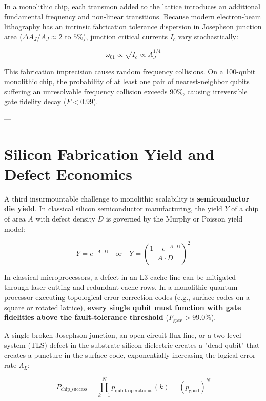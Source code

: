In a monolithic chip, each transmon added to the lattice introduces an additional fundamental frequency and non-linear transitions. Because modern electron-beam lithography has an intrinsic fabrication tolerance dispersion in Josephson junction area ($\Delta A_J / A_J \approx 2\text{ to }5\%$), junction critical currents $I_c$ vary stochastically:

\begin{equation}
    \omega_{01} \propto \sqrt{I_c} \propto A_J^{1/4}
\end{equation}

This fabrication imprecision causes random frequency collisions. On a 100-qubit monolithic chip, the probability of at least one pair of nearest-neighbor qubits suffering an unresolvable frequency collision exceeds 90\%, causing irreversible gate fidelity decay ($F < 0.99$).

---

\section{Silicon Fabrication Yield and Defect Economics}

A third insurmountable challenge to monolithic scalability is \textbf{semiconductor die yield}. In classical silicon semiconductor manufacturing, the yield $Y$ of a chip of area $A$ with defect density $D$ is governed by the Murphy or Poisson yield model:

\begin{equation}
    Y = e^{-A \cdot D} \quad \text{or} \quad Y = \left( \frac{1 - e^{-A \cdot D}}{A \cdot D} \right)^2
\end{equation}

In classical microprocessors, a defect in an L3 cache line can be mitigated through laser cutting and redundant cache rows. In a monolithic quantum processor executing topological error correction codes (e.g., surface codes on a square or rotated lattice), \textbf{every single qubit must function with gate fidelities above the fault-tolerance threshold} ($F_{\text{gate}} > 99.0\%$).

A single broken Josephson junction, an open-circuit flux line, or a two-level system (TLS) defect in the substrate silicon dielectric creates a "dead qubit" that creates a puncture in the surface code, exponentially increasing the logical error rate $\Lambda_L$:

\begin{equation}
    P_{\text{chip\_success}} = \prod_{k=1}^{N} p_{\text{qubit\_operational}}(k) = (p_{\text{good}})^N
\end{equation}

